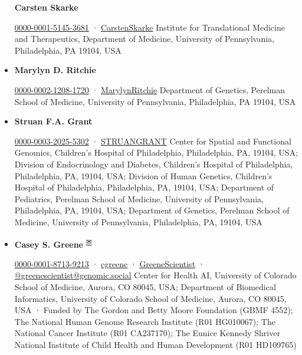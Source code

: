 \documentclass[
]{article}
\begin{document}
\begin{itemize}
  \textbf{Carsten Skarke}
  
  \href{https://orcid.org/0000-0001-5145-3681}{0000-0001-5145-3681}
  · 
  \href{https://twitter.com/CarstenSkarke}{CarstenSkarke}
  Institute for Translational Medicine and Therapeutics, Department of Medicine, University of Pennsylvania, Philadelphia, PA 19104, USA
\item
  \textbf{Marylyn D. Ritchie}
  
  \href{https://orcid.org/0000-0002-1208-1720}{0000-0002-1208-1720}
  · 
  \href{https://twitter.com/MarylynRitchie}{MarylynRitchie}
  Department of Genetics, Perelman School of Medicine, University of Pennsylvania, Philadelphia, PA 19104, USA
\item
  \textbf{Struan F.A. Grant}
  
  \href{https://orcid.org/0000-0003-2025-5302}{0000-0003-2025-5302}
  · 
  \href{https://twitter.com/STRUANGRANT}{STRUANGRANT}
  Center for Spatial and Functional Genomics, Children's Hospital of Philadelphia, Philadelphia, PA, 19104, USA; Division of Endocrinology and Diabetes, Children's Hospital of Philadelphia, Philadelphia, PA, 19104, USA; Division of Human Genetics, Children's Hospital of Philadelphia, Philadelphia, PA, 19104, USA; Department of Pediatrics, Perelman School of Medicine, University of Pennsylvania, Philadelphia, PA, 19104, USA; Department of Genetics, Perelman School of Medicine, University of Pennsylvania, Philadelphia, PA, 19104, USA
\item
  \textbf{Casey S. Greene}
  \textsuperscript{\protect\hyperlink{correspondence}{✉}}
  
  \href{https://orcid.org/0000-0001-8713-9213}{0000-0001-8713-9213}
  · 
  \href{https://github.com/cgreene}{cgreene}
  · 
  \href{https://twitter.com/GreeneScientist}{GreeneScientist}
  · 
  \href{https://genomic.social/@greenescientist}{@greenescientist@genomic.social}
  Center for Health AI, University of Colorado School of Medicine, Aurora, CO 80045, USA; Department of Biomedical Informatics, University of Colorado School of Medicine, Aurora, CO 80045, USA
  · Funded by The Gordon and Betty Moore Foundation (GBMF 4552); The National Human Genome Research Institute (R01 HG010067); The National Cancer Institute (R01 CA237170); The Eunice Kennedy Shriver National Institute of Child Health and Human Development (R01 HD109765)
\end{itemize}
\end{document}

